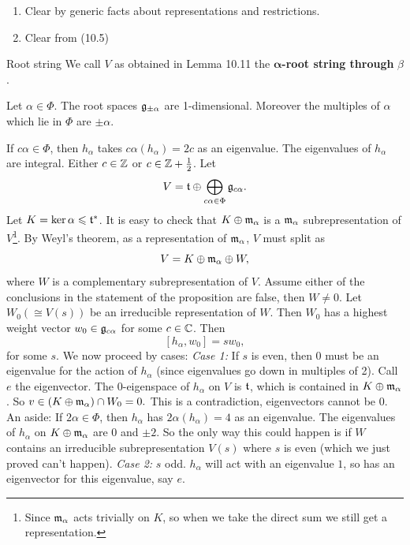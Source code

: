 \documentclass{article}
\begin{document}
\proof \hspace{0.1cm}
\begin{enumerate}
    \item Clear by generic facts about representations and restrictions.
    \item Clear from (10.5)
\end{enumerate}
\endproof
\begin{fancydefine*}{Root string}
     We call $V$ as obtained in Lemma 10.11 the $\mathbf{\alpha}$\textbf{-root string through }$\beta$.
\end{fancydefine*}
\begin{fancyprop}{}
    Let $\alpha \in \Phi$. The root spaces $\mathfrak{g}_{\pm \alpha}$ are 1-dimensional. Moreover the multiples of $\alpha$ which lie in $\Phi$ are $\pm \alpha$.
\end{fancyprop}
\proof If $c \alpha \in \Phi$, then $h_{\alpha}$ takes $c \alpha(h_{\alpha})=2c$ as an eigenvalue. The eigenvalues of $h_{\alpha}$ are integral. Either $c \in \mathbb{Z}$ or $c \in \mathbb{Z} + \frac{1}{2}$. \gap 
Let \[ V = \mathfrak{t} \oplus \bigoplus_{c \alpha \in \Phi} \mathfrak{g}_{c \alpha}.\] Let $K = \ker \alpha \leqslant \mathfrak{t}^{*} $. It is easy to check that $K \oplus \mathfrak{m}_{\alpha}$ is a $\mathfrak{m}_{\alpha}$ subrepresentation of $V$\footnote{Since $\mathfrak{m}_{\alpha}$ acts trivially on $K$, so when we take the direct sum we still get a representation.}. 
By Weyl's theorem, as a representation of $\mathfrak{m}_{\alpha}$, $V$ must split as \[ V = K \oplus \mathfrak{m}_{\alpha} \oplus W,\] where $W$ is a complementary subrepresentation of $V$. Assume either of the conclusions in the statement of the proposition are false, then $W \neq 0$. Let $W_{0} (\cong V(s))$ be an irreducible representation of $W$. Then $W_{0}$ has a highest weight vector $w_{0} \in \mathfrak{g}_{c \alpha}$ for some $c \in \mathbb{C}$. Then \[ [h_{\alpha}, w_{0}] = sw_{0},\] for some $s$. We now proceed by cases: 
\gap \textit{Case 1:} If $s$ is even, then $0$ must be an eigenvalue for the action of $h_{\alpha}$ (since eigenvalues go down in multiples of 2). Call $e$ the eigenvector. The $0$-eigenspace of $h_{\alpha}$ on $V$ is $\mathfrak{t}$, which is contained in $K \oplus \mathfrak{m}_{\alpha}$. So $v \in (K \oplus \mathfrak{m}_{\alpha}) \cap W_{0} =0.$ This is a contradiction, eigenvectors cannot be $0$. \gap An aside: If $2 \alpha \in \Phi$, then $h_{\alpha}$ has $2\alpha(h_{\alpha})=4$ as an eigenvalue. The eigenvalues of $h_{\alpha}$ on $K \oplus \mathfrak{m}_{\alpha}$ are $0$ and $\pm 2$. So the only way this could happen is if $W$ contains an irreducible subrepresentation $V(s)$ where $s$ is even (which we just proved can't happen). \gap \textit{Case 2:} $s$ odd. $h_{\alpha}$ will act with an eigenvalue $1$, so has an eigenvector for this eigenvalue, say $e$. \gap 
\end{document}
